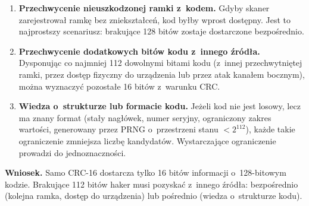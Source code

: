 \documentclass[12pt,a4paper]{article}
\begin{document}
\begin{enumerate}[label=\arabic*.]

  \item \textbf{Przechwycenie nieuszkodzonej ramki z~kodem.}
        Gdyby skaner zarejestrował ramkę bez zniekształceń, kod byłby wprost
        dostępny. Jest to najprostszy scenariusz: brakujące 128 bitów zostaje
        dostarczone bezpośrednio.

  \item \textbf{Przechwycenie dodatkowych bitów kodu z~innego źródła.}
        Dysponując co najmniej 112 dowolnymi bitami kodu (z~innej
        przechwytniętej ramki, przez dostęp fizyczny do urządzenia lub
        przez atak kanałem bocznym), można wyznaczyć pozostałe 16 bitów
        z~warunku CRC.

  \item \textbf{Wiedza o~strukturze lub formacie kodu.}
        Jeżeli kod nie jest losowy, lecz ma znany format (stały nagłówek,
        numer seryjny, ograniczony zakres wartości, generowany przez PRNG
        o~przestrzeni stanu $< 2^{112}$), każde takie ograniczenie zmniejsza
        liczbę kandydatów. Wystarczające ograniczenie prowadzi do
        jednoznaczności.

\end{enumerate}

\medskip
\noindent\textbf{Wniosek.}
Samo CRC-16 dostarcza tylko 16 bitów informacji o~128-bitowym kodzie.
Brakujące 112 bitów haker musi pozyskać z~innego źródła: bezpośrednio
(kolejna ramka, dostęp do urządzenia) lub pośrednio (wiedza o~strukturze kodu).
\end{document}
